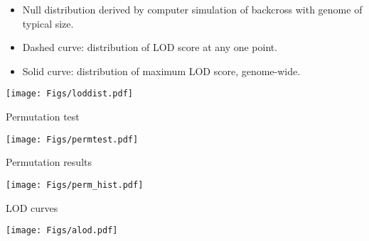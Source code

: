 \documentclass[12pt]{article}
\newcommand{\headsize}{\fontsize{35}{35} \selectfont}
\newcommand{\smallersize}{\fontsize{20}{25} \selectfont}
\begin{document}
\hspace*{0.5in}
\begin{minipage}[t]{4.7in}
\vspace*{10mm}

\color{mywhite} \smallersize
\begin{itemize}
\setlength{\rightskip}{0pt plus 1fil} %
\item Null distribution derived by computer simulation of backcross
with genome of typical size.
\item Dashed curve: distribution of LOD score at any one point.
\item Solid curve: distribution of maximum LOD score, genome-wide.
\end{itemize}
\end{minipage}
\hfill
\begin{minipage}[t]{4.7in}
\vspace*{0cm}

\texttt{[image: Figs/loddist.pdf]}
\end{minipage}








\newpage

\headsize \color{myyellow}
\hfill \begin{minipage}{5.75in}
\centering
Permutation test
\end{minipage}

\vspace{2cm}

\centerline{\texttt{[image: Figs/permtest.pdf]}}

\newpage

\headsize \color{myyellow}
\hfill \begin{minipage}{5.75in}
\centering
Permutation results
\end{minipage}

\vfill

\centerline{\texttt{[image: Figs/perm\_hist.pdf]}}



\newpage

\headsize \color{myyellow}
\hfill \begin{minipage}{5.75in}
\centering
LOD curves
\end{minipage}

\vfill

\centerline{\texttt{[image: Figs/alod.pdf]}}


\newpage
\end{document}
